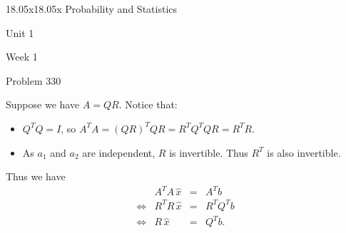 \begin{edXcourse}{18.05x}{18.05x Probability and Statistics}
\begin{edXchapter}{Unit 1}
\begin{edXsection}{Week 1}
\begin{edXsequential}
\begin{edXproblem}{Problem 3}{30}
\begin{enumerate}
\begin{sol}
Suppose we have $A = QR$. Notice that:
\begin{itemize}
\item $Q^T Q = I$, so $A^T A = (QR)^T QR = R^T Q^T Q R = R^T R$.
\item As $a_1$ and $a_2$ are independent, $R$ is invertible. Thus $R^T$ is also invertible.
\end{itemize}
Thus we have
$$
\begin{matrix}
  & A^T A \, \widehat{x} & = & A^T b \\
\Leftrightarrow
 & R^T R \, \widehat{x}  &  = & R^T Q^T b \\
\Leftrightarrow  & R \, \widehat{x} &  = & Q^T b.
\end{matrix}
$$

\end{sol}

\end{enumerate}

\end{edXproblem}

\end{edXsequential}
\end{edXsection}
\end{edXchapter}
\end{edXcourse}







